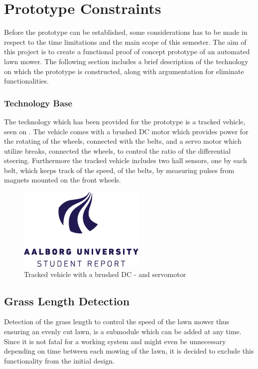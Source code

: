 \section{Prototype Constraints}
Before the prototype can be established, some considerations has to be made in respect to the time limitations and the main scope of this semester. The aim of this project is to create a functional proof of concept prototype of an automated lawn mower. The following section includes a brief description of the technology on which the prototype is constructed, along with argumentation for eliminate functionalities.

\subsubsection{Technology Base}
The technology which has been provided for the prototype is a tracked vehicle, seen on . The vehicle comes with a brushed DC motor which provides power for the rotating of the wheels, connected with the belts, and a servo motor which utilize breaks, connected the wheels, to control the ratio of the differential steering. Furthermore the tracked vehicle includes two hall sensors, one by each belt, which keeps track of the speed, of the belts, by measuring pulses from magnets mounted on the front wheels.

\begin{figure}[H]
	\centering
	\includegraphics[scale=.7]{figures/aaulogo-en}
	\flushleft
	\caption{Tracked vehicle with a brushed DC - and servomotor}
	\label{TrackedVehicle}
\end{figure}

\subsection{Grass Length Detection}
Detection of the grass length to control the speed of the lawn mower thus ensuring an evenly cut lawn, is a submodule which can be added at any time. Since it is not fatal for a working system and might even be unnecessary depending on time between each mowing of the lawn, it is decided to exclude this functionality from the initial design.

